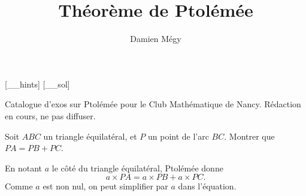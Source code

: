 




[_\jobname_hints]
[_\jobname_sol]


\title{Théorème de Ptolémée}
\author{Damien Mégy}
\maketitle

Catalogue d'exos sur Ptolémée pour le Club Mathématique de Nancy. Rédaction en cours, ne pas diffuser.




\begin{exo}
Soit $ABC$ un triangle équilatéral, et $P$ un point de l'arc $BC$. Montrer que $PA=PB+PC$.
\begin{sol}
En notant $a$ le côté du triangle équilatéral, Ptolémée donne 
\[ a\times PA = a\times PB+a\times PC.\]
Comme $a$ est non nul, on peut simplifier par $a$ dans l'équation.
\end{sol}
\end{exo}


